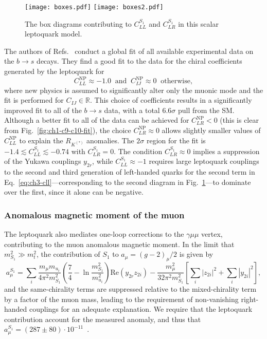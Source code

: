 \begin{figure}[t]%
  \centering
  \texttt{[image: boxes.pdf]}
  \qquad
  \texttt{[image: boxes2.pdf]}
  \caption{The box diagrams contributing to $C_{LL}^{S_{1}}$ and $C_{LR}^{S_{1}}$ in
    this scalar leptoquark model.}
  \label{fig:ch3-boxes}
\end{figure}

The authors of Refs.~\cite{Aebischer:2019mlg} conduct a global fit of all
available experimental data on the $b \rightarrow s$ decays. They find a good
fit to the data for the chiral coefficients generated by the leptoquark for
\begin{equation} \label{eq:ch3-cll12clr0}
  C_{LL}^{\text{NP}} \approx -1.0 \ \text{ and } \ C_{IJ}^{\text{NP}} \approx 0 \ \text{ otherwise},
\end{equation}
where new physics is assumed to significantly alter only the muonic mode and the
fit is performed for $C_{IJ} \in \mathbb{R}$. This choice of coefficients
results in a significantly improved fit to all of the $b \to s$ data, with a
total $6.6\sigma$ pull from the SM. Although a better fit to all of the data can
be achieved for $C_{LR}^{\text{NP}} < 0$ (this is clear from
Fig.~\ref{fig:ch1-c9-c10-fit}), the choice $C_{LR}^{\text{NP}}\approx 0$ allows
slightly smaller values of $C_{LL}^{\text{NP}}$ to explain the $R_{K^{(*)}}$
anomalies. The $2\sigma$ region for the fit is
$-1.4 \lesssim C_{LL}^{S_{1}} \lesssim -0.74$ with $C_{LR}^{S_{1}} = 0$. The
condition $C_{LR}^{S_{1}} \approx 0$ implies a suppression of the Yukawa
couplings $y_{2r}$, while $C_{LL}^{S_{1}} \approx -1$ requires large leptoquark
couplings to the second and third generation of left-handed quarks for the
second term in Eq.~\eqref{eq:ch3-cll}---corresponding to the second diagram in
Fig.~\ref{fig:ch3-boxes}---to dominate over the first, since it alone can be
negative.

\subsubsection{Anomalous magnetic moment of the muon}
\label{sec:ch3-gminus2}

The leptoquark also mediates one-loop corrections to the $\gamma \mu \mu$ vertex,
contributing to the muon anomalous magnetic moment. In the limit that $m_{S_{1}}^2
\gg m_t^2$, the contribution of $S_{1}$ to $a_\mu = (g - 2)_\mu/2$ is given
by~\cite{Bauer:2015knc, Djouadi:1989md, Chakraverty:2001yg, Cheung:2001ip}
\begin{equation} \label{eq:ch3-amu}
  a_\mu^{S_{1}} = \sum_{i} \frac{m_\mu m_{u_i}}{4\pi^2 m_{S_{1}}^2} \left(
    \frac{7}{4} - \ln \frac{m_{S_{1}}^2}{m_{u_i}^2} \right) \text{Re}
  (y_{2r} z_{2 i}) - \frac{m_\mu^2}{32 \pi^2 m_{S_{1}}^2}
  \left[ \sum_i |z_{2 i}|^2 + \sum_i |y_{2 i}|^2 \right],
\end{equation}
and the same-chirality terms are suppressed relative to the mixed-chirality term
by a factor of the muon mass, leading to the requirement of non-vanishing
right-handed couplings for an adequate explanation. We require that the
leptoquark contribution account for the measured anomaly, and thus that
$a_\mu^{S_{1}} = (287 \pm 80) \cdot 10^{-11}$~\cite{Davier:2010nc}.


